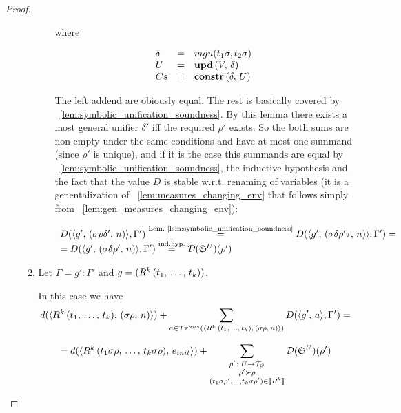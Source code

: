 \begin{proof}
\begin{enumerate}
\begin{enumerate}
\begin{enumerate}
    		where
    
    \[ \begin{array}{lcl}
    \delta & = & mgu(t_1 \sigma, t_2 \sigma) \\
    U & = & \mbox{\textbf{upd}}\,(V,\, \delta) \\
    Cs & = & \mbox{\textbf{constr}}\,(\delta,\, U) \\
	\end{array} \]
	
			The left addend are obiously equal. The rest is basically covered by \lemmaword~\ref{lem:symbolic_unification_soundness}. By this lemma there exists a most general unifier $\delta'$ iff the required $\rho'$ exists. So the both sums are non-empty under the same conditions and have at most one summand (since $\rho'$ is unique), and if it is the case this summands are equal by \lemmaword~\ref{lem:symbolic_unification_soundness}, the inductive hypothesis and the fact that the value $D$ is stable w.r.t. renaming of variables (it is a genentalization of \lemmaword~\ref{lem:measures_changing_env} that follows simply from \lemmaword~\ref{lem:gen_measures_changing_env}):
	
\[ \begin{array}{l}
D(\langle g' ,\, (\sigma \rho \delta' ,\, n) \rangle, \Gamma') \stackrel{\text{Lem.~\ref{lem:symbolic_unification_soundness}}}{=} D(\langle g' ,\, (\sigma \delta \rho' \tau ,\, n) \rangle, \Gamma') = \\
= D(\langle g' ,\, (\sigma \delta \rho' ,\, n) \rangle, \Gamma') \stackrel{\text{ind.hyp.}}{=} \mathcal{D}({\mathfrak{S}}^{U})(\rho')
\end{array} \] 

	\end{enumerate}
	
	\item Let $\Gamma = g' : \Gamma'$ and $g = (R^k\,(t_1, \, \dots, \, t_k))$.
	
	In this case we have \[ d(\langle R^k\,(t_1, \, \dots, \, t_k) ,\, (\sigma\rho ,\, n) \rangle) + \sum\limits_{a \in \mathcal{T}r^{ans}(\langle R^k\,(t_1, \, \dots, \, t_k) ,\, (\sigma\rho ,\, n) \rangle)} D(\langle g' ,\, a \rangle, \Gamma') = \]
	
	\[ = d(\langle R^k\,(t_1 \sigma \rho, \, \dots, \, t_k \sigma \rho) ,\, e_{init} \rangle) +
      \sum\limits_{\substack{ \rho' \colon U \to \mathcal{T}_{\varnothing} \\
                                      \rho' \succ \rho \\
                                      (t_1 \sigma \rho', \dots, t_k \sigma \rho') \in \llbracket R^k \rrbracket  }}
           \mathcal{D}({\mathfrak{S}}^{U})(\rho')  \]
           

\end{enumerate}
\end{enumerate}
\end{proof}
